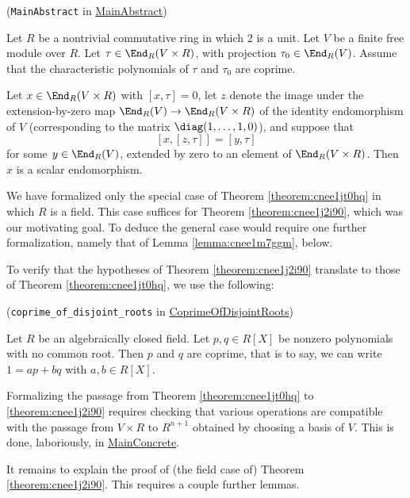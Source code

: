 \documentclass[reqno]{amsart} 
\begin{document}
\begin{theorem}\label{theorem:cnee1jt0hq}
  (\verb|MainAbstract| in \href{MainAbstract.lean}{MainAbstract})
  
  Let $R$ be a nontrivial commutative ring in which $2$ is a unit.  Let $V$ be a finite free module over $R$.  Let $\tau \in \End_R(V \times R)$, with projection $\tau_0 \in \End_R(V)$.  Assume that the characteristic polynomials of $\tau$ and $\tau_0$ are coprime.

  Let $x \in \End_R(V \times R)$ with $[x,\tau] = 0$, let $z$ denote the image under the extension-by-zero map $\End_R(V) \rightarrow \End_R(V \times R)$ of the identity endomorphism of $V$ (corresponding to the matrix $\diag(1,\dotsc,1,0)$), and suppose that
  \[
    [x,[z,\tau]] = [y, \tau]
  \]
  for some $y \in \End_R(V)$, extended by zero to an element of $\End_R(V \times R)$.  Then $x$ is a scalar endomorphism.
\end{theorem}
\begin{remark}\label{remark:cnee1noh9i}
  We have formalized only the special case of Theorem \ref{theorem:cnee1jt0hq} in which $R$ is a field.  This case suffices for Theorem \ref{theorem:cnee1j2i90}, which was our motivating goal.  To deduce the general case would require one further formalization, namely that of Lemma \ref{lemma:cnee1m7ggm}, below.
\end{remark}

To verify that the hypotheses of Theorem \ref{theorem:cnee1j2i90} translate to those of Theorem \ref{theorem:cnee1jt0hq}, we use the following:
\begin{lemma}\label{lemma:cnee1nts0y}
  (\verb|coprime_of_disjoint_roots| in \href{CoprimeOfDisjointRoots.lean}{CoprimeOfDisjointRoots})

  Let $R$ be an algebraically closed field.  Let $p, q \in R[X]$ be nonzero polynomials with no common root.  Then $p$ and $q$ are coprime, that is to say, we can write $1 = a p + b q$ with $a,b \in R[X]$.
\end{lemma}

Formalizing the passage from Theorem \ref{theorem:cnee1jt0hq} to \ref{theorem:cnee1j2i90} requires checking that various operations are compatible with the passage from $V \times R$ to $R^{n+1}$ obtained by choosing a basis of $V$.  This is done, laboriously, in \href{MainConcrete.lean}{MainConcrete}.

It remains to explain the proof of (the field case of) Theorem \ref{theorem:cnee1j2i90}.  This requires a couple further lemmas.
\end{document}
